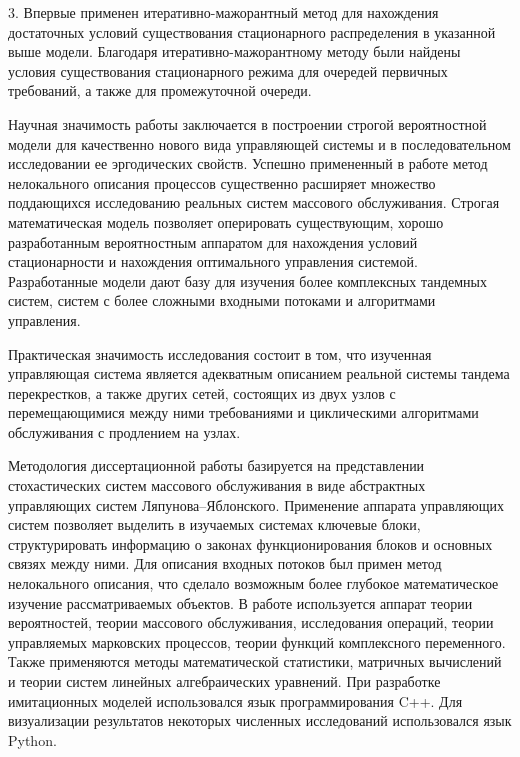 3. Впервые применен итеративно-мажорантный метод для нахождения достаточных условий существования стационарного распределения в указанной выше модели. Благодаря итеративно-мажорантному методу были найдены условия существования стационарного режима для очередей первичных требований, а также для промежуточной очереди.






{\influence} Научная значимость работы заключается в построении строгой вероятностной модели 
для качественно нового вида управляющей системы и в последовательном исследовании ее эргодических свойств. Успешно примененный в работе метод нелокального описания процессов существенно расширяет множество поддающихся исследованию реальных систем массового обслуживания. Строгая математическая модель позволяет оперировать существующим, хорошо разработанным вероятностным аппаратом для нахождения условий стационарности и нахождения оптимального управления системой. 
 Разработанные модели дают базу для изучения более комплексных тандемных систем, систем с более сложными входными потоками и алгоритмами управления.

Практическая значимость исследования состоит в том, что изученная управляющая система является адекватным описанием реальной системы тандема перекрестков, а также других сетей, состоящих из двух узлов с перемещающимися между ними требованиями и циклическими алгоритмами обслуживания с продлением на узлах.




{\methods} Методология диссертационной работы базируется на представлении стохастических систем массового обслуживания в виде абстрактных управляющих систем Ляпунова--Яблонского. Применение аппарата управляющих систем позволяет выделить в изучаемых системах ключевые блоки, структурировать информацию о законах функционирования блоков и основных связях между ними. Для описания входных потоков был примен метод нелокального описания, что сделало возможным более глубокое математическое изучение рассматриваемых объектов. В работе используется аппарат теории вероятностей, теории массового обслуживания, исследования операций, теории управляемых марковских процессов, теории функций комплексного переменного. Также применяются методы математической статистики, матричных вычислений и теории систем линейных алгебраических уравнений. При разработке имитационных моделей использовался язык программирования C++. Для визуализации результатов некоторых численных исследований использовался язык Python.


